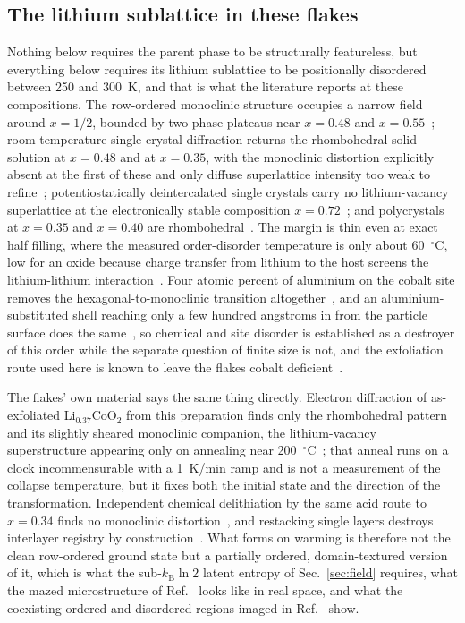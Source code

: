 \documentclass[reprint,twocolumn,prb,amsmath,amssymb,superscriptaddress,floatfix]{revtex4-2}
\newcommand{\kB}{k_{\mathrm{B}}}
\begin{document}
\subsection{The lithium sublattice in these flakes}
\label{sec:lisublattice}

Nothing below requires the parent phase to be structurally featureless, but everything below
requires its lithium sublattice to be positionally disordered between 250 and 300~K, and that is
what the literature reports at these compositions. The row-ordered monoclinic structure occupies
a narrow field around $x=1/2$, bounded by two-phase plateaus near $x=0.48$ and
$x=0.55$~\cite{Motohashi2009}; room-temperature single-crystal diffraction returns the
rhombohedral solid solution at $x=0.48$ and at $x=0.35$, with the monoclinic distortion
explicitly absent at the first of these and only diffuse superlattice intensity too weak to
refine~\cite{Takahashi2007}; potentiostatically deintercalated single crystals carry no
lithium-vacancy superlattice at the electronically stable composition
$x=0.72$~\cite{OuYang2012}; and polycrystals at $x=0.35$ and
$x=0.40$ are rhombohedral~\cite{Motohashi2009}. The margin is thin even at exact half filling,
where the measured order-disorder temperature is only about 60~$^{\circ}$C, low for an oxide
because charge transfer from lithium to the host screens the lithium-lithium
interaction~\cite{Reimers1992,VanderVen1998}. Four atomic percent of aluminium on the cobalt site
removes the hexagonal-to-monoclinic transition altogether~\cite{ErRami2022}, and an
aluminium-substituted shell reaching only a few hundred angstroms in from the particle surface
does the same~\cite{Cho2001}, so chemical and site disorder is established as a destroyer of this
order while the separate question of finite size is not, and the exfoliation route used here is
known to leave the flakes cobalt deficient~\cite{Pachuta2019}.

The flakes' own material says the same thing directly. Electron diffraction of as-exfoliated
Li$_{0.37}$CoO$_2$ from this preparation finds only the rhombohedral pattern and its slightly
sheared monoclinic companion, the lithium-vacancy superstructure appearing only on annealing
near 200~$^{\circ}$C~\cite{Volkova2021,RadhaPerspective2021}; that anneal runs on a clock
incommensurable with a 1~K/min ramp and is not a measurement of the collapse temperature, but it
fixes both the initial state and the direction of the transformation. Independent chemical
delithiation by the same acid route to $x=0.34$ finds no monoclinic
distortion~\cite{Basch2014}, and restacking single layers destroys interlayer registry by
construction~\cite{Cheng2016}. What forms on warming is therefore not the clean row-ordered
ground state but a partially ordered, domain-textured version of it, which is what the
sub-$\kB\ln2$ latent entropy of Sec.~\ref{sec:field} requires, what the mazed microstructure of
Ref.~\cite{ShaoHorn2003} looks like in real space, and what the coexisting ordered and
disordered regions imaged in Ref.~\cite{Iwaya2013} show.
\end{document}
